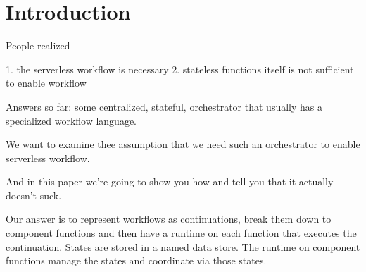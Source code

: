 \section{Introduction}


People realized

1. the serverless workflow is necessary
2. stateless functions itself is not sufficient to enable workflow

Answers so far: some centralized, stateful, orchestrator that usually has a specialized workflow language.

We want to examine thee assumption that we need such an orchestrator to enable serverless workflow.

And in this paper we're going to show you how and tell you that it actually doesn't suck.

Our answer is to represent workflows as continuations, break them down to component functions and then have a runtime on each function that executes the continuation. States are stored in a named data store. The runtime on component functions manage the states and coordinate via those states.

